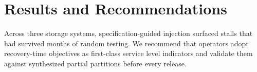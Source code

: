 \documentclass[11pt]{article}
\begin{document}
\section{Results and Recommendations}
Across three storage systems, specification-guided injection surfaced stalls
that had survived months of random testing. We recommend that operators adopt
recovery-time objectives as first-class service level indicators and validate
them against synthesized partial partitions before every release.
\end{document}
